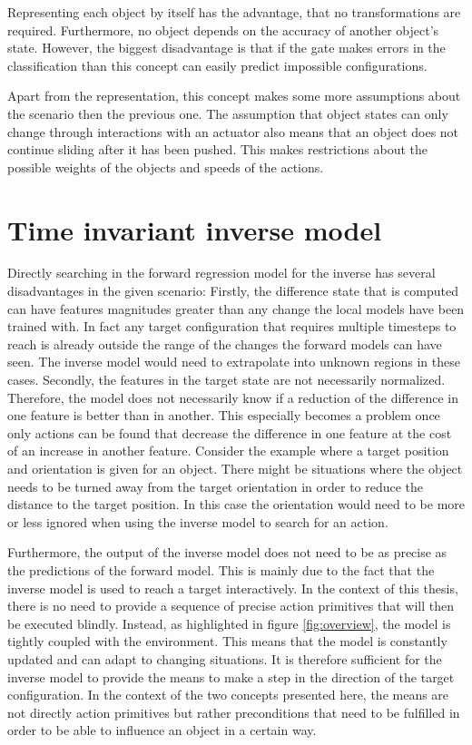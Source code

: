 Representing each object by itself has the advantage, that no transformations are required. Furthermore, no object depends on the accuracy of another object's state. However, the biggest disadvantage is that if the gate makes errors in the classification than this concept can easily predict impossible configurations. 

Apart from the representation, this concept makes some more assumptions about the scenario then the previous one. The assumption that object states can only change through interactions with an actuator also means that an object does not continue sliding after it has been pushed. This makes restrictions about the possible weights of the objects and speeds of the actions.

\section{Time invariant inverse model \label{sec:invModel}}
	
Directly searching in the forward regression model for the inverse has several disadvantages in the given scenario: Firstly, the difference state that is computed can have features magnitudes greater than any change the local models have been trained with. In fact any target configuration that requires multiple timesteps to reach is already outside the range of the changes the forward models can have seen. 
The inverse model would need to extrapolate into unknown regions in these cases. Secondly, the features in the target state are not necessarily normalized. Therefore, the model does not necessarily know if a reduction of the difference in one feature is better than in another. This especially becomes a problem once only actions can be found that decrease the difference in one feature at the cost of an increase in another feature. Consider the example where a target position and orientation is given for an object. There might be situations where the object needs to be turned away from the target orientation in order to reduce the distance to the target position. In this case the orientation would need to be more or less ignored when using the inverse model to search for an action.

Furthermore, the output of the inverse model does not need to be as precise as the predictions of the forward model. This is mainly due to the fact that the inverse model is used to reach a target interactively. In the context of this thesis, there is no need to provide a sequence of precise action primitives that will then be executed blindly. Instead, as highlighted in figure \ref{fig:overview}, the model is tightly coupled with the environment. This means that the model is constantly updated and can adapt to changing situations. It is therefore sufficient for the inverse model to provide the means to make a step in the direction of the target configuration. In the context of the two concepts presented here, the means are not directly action primitives but rather preconditions that need to be fulfilled in order to be able to influence an object in a certain way.

